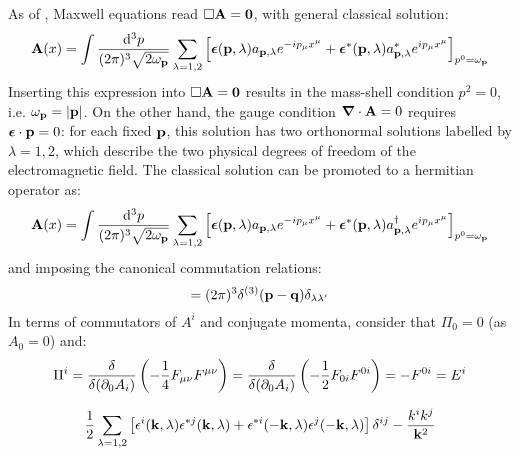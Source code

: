 As of , Maxwell equations  read $ \Box \mathbf{A} = \mathbf{0} $, with general classical solution:
\begin{equation*}
  \mathbf{A}(x) = \int \frac{\mathrm{d}^3p}{(2\pi)^3 \sqrt{2\omega_{\mathbf{p}}}} \sum_{\lambda = 1,2} \left[ \boldsymbol{\epsilon}(\mathbf{p},\lambda) a_{\mathbf{p},\lambda} e^{-i p_\mu x^\mu} + \boldsymbol{\epsilon}^*(\mathbf{p},\lambda)a^*_{\mathbf{p},\lambda} e^{i p_\mu x^\mu} \right]_{p^0 = \omega_{\mathbf{p}}}
\end{equation*}
Inserting this expression into $ \Box \mathbf{A} = \mathbf{0} $ results in the mass-shell condition $ p^2 = 0 $, i.e. $ \omega_{\mathbf{p}} = \left\lvert\mathbf{p}\right\rvert $. On the other hand, the gauge condition $ \boldsymbol{\nabla}\cdot \mathbf{A} = 0 $ requires $ \boldsymbol{\epsilon} \cdot \mathbf{p} = 0 $: for each fixed $ \mathbf{p} $, this solution has two orthonormal solutions labelled by $ \lambda = 1,2 $, which describe the two physical degrees of freedom of the electromagnetic field.
The classical solution can be promoted to a hermitian operator as:
\begin{equation}
  \mathbf{A}(x) = \int \frac{\mathrm{d}^3p}{(2\pi)^3 \sqrt{2\omega_{\mathbf{p}}}} \sum_{\lambda = 1,2} \left[ \boldsymbol{\epsilon}(\mathbf{p},\lambda) a_{\mathbf{p},\lambda} e^{-i p_\mu x^\mu} + \boldsymbol{\epsilon}^*(\mathbf{p},\lambda)a^\dagger_{\mathbf{p},\lambda} e^{i p_\mu x^\mu} \right]_{p^0 = \omega_{\mathbf{p}}}
  \label{eq:qed-four-rad}
\end{equation}
and imposing the canonical commutation relations:
\begin{equation}
  [a_{\ve{p},\lambda} , a_{\ve{q},\lambda'}\dg] = (2\pi)^3 \delta^{(3)}(\ve{p} - \ve{q}) \delta_{\lambda \lambda'}
\end{equation}
In terms of commutators of $ A^i $ and conjugate momenta, consider that $ \Pi_0 = 0 $ (as $ A_0 = 0 $) and\footnotemark:
\begin{equation*}
  \Pi^i = \frac{\delta}{\delta(\partial_0 A_i)} \left( -\frac{1}{4} F_{\mu \nu} F^{\mu \nu} \right) = \frac{\delta}{\delta(\partial_0 A_i)} \left( -\frac{1}{2} F_{0i} F^{0i} \right) = - F^{0i} = E^i
\end{equation*}
%
%
\begin{lemma}[before upper = {\tcbtitle}]{}{}
  \begin{equation}
    \frac{1}{2} \sum_{\lambda = 1,2} \left[ \epsilon^i(\mathbf{k},\lambda) \epsilon^{*j}(\mathbf{k},\lambda) + \epsilon^{*i}(-\mathbf{k},\lambda) \epsilon^j(-\mathbf{k},\lambda) \right] \delta^{ij} - \frac{k^i k^j}{\mathbf{k}^2}
  \end{equation}
\end{lemma}

